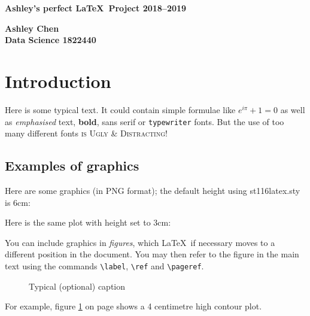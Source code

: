 \documentclass[a4paper]{article}
\begin{document}
\begin{center}
\LARGE
\textbf{\huge Ashley's perfect \LaTeX\ Project 2018--2019}   %
\par
\textbf{Ashley Chen}        %
\\
\textbf{Data Science  1822440}      %
\end{center}

\section{Introduction}
Here is some typical text.
It could contain simple formulae like $e^{i\pi}+1=0$ as well as 
\emph{emphasised} text, \textbf{bold}, 
\textsf{sans serif} or \texttt{typewriter} fonts.
But the use of too many different fonts 
\textsc{is Ugly \large \& Distracting!}

\subsection{Examples of graphics}


Here are some graphics (in PNG format); 
the default height using \textsf{st116latex.sty} is 6cm: 

Here is the same plot with height set to 3cm: 

You can include graphics in \emph{figures}, 
which \LaTeX\ if necessary moves to a different position in the document.
You may then refer to the figure in the main text using the commands
\verb¬\label¬, \verb¬\ref¬ and \verb¬\pageref¬.
\begin{figure}
\label{figcont}   %
\caption{Typical (optional) caption}   %
\end{figure}
For example, figure \ref{figcont} on page \pageref{figcont}
shows a 4 centimetre high contour plot.
\end{document}
